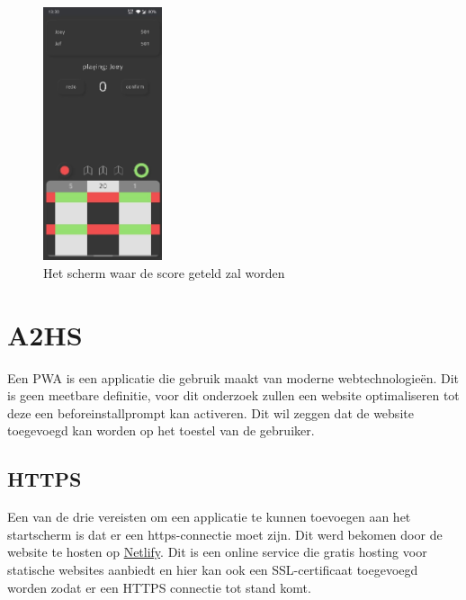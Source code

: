 	\begin{figure}[H]
		\centering
		\includegraphics[width=35mm]{./img/dart3.png}{}
		\caption{Het scherm waar de score geteld zal worden}
	\end{figure}
	


\section{A2HS}

	Een PWA is een applicatie die gebruik maakt van moderne webtechnologieën. Dit is geen meetbare definitie, voor dit onderzoek zullen een website optimaliseren tot deze een beforeinstallprompt kan activeren. Dit wil zeggen dat de website toegevoegd kan worden op het toestel van de gebruiker.

	\subsection{HTTPS}

		Een van de drie vereisten om een applicatie te kunnen toevoegen aan het startscherm is dat er een https-connectie moet zijn. Dit werd bekomen door de website te hosten op \href{https://www.netlify.com/}{ Netlify}. Dit is een online service die gratis hosting voor statische websites aanbiedt en hier kan ook een SSL-certificaat toegevoegd worden zodat er een HTTPS connectie tot stand komt.


